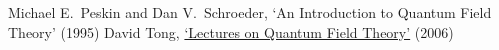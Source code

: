 \documentclass{report}
\begin{document}
\maketitle
\hypersetup{linkcolor=black}
\tableofcontents
\hypersetup{linkcolor=MidnightBlue!50!BlueViolet}
\newpage

























\begin{thebibliography}{99}

 Michael E.~Peskin and Dan V.~Schroeder, `An Introduction to Quantum Field Theory' (1995)
 David Tong, \href{http://www.damtp.cam.ac.uk/user/tong/qft.html}{`Lectures on Quantum Field Theory'} (2006)

\end{thebibliography}
\end{document}
